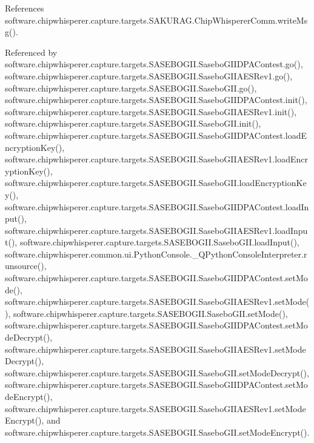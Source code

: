 References software.\+chipwhisperer.\+capture.\+targets.\+S\+A\+K\+U\+R\+A\+G.\+Chip\+Whisperer\+Comm.\+write\+Msg().



Referenced by software.\+chipwhisperer.\+capture.\+targets.\+S\+A\+S\+E\+B\+O\+G\+I\+I.\+Sasebo\+G\+I\+I\+D\+P\+A\+Contest.\+go(), software.\+chipwhisperer.\+capture.\+targets.\+S\+A\+S\+E\+B\+O\+G\+I\+I.\+Sasebo\+G\+I\+I\+A\+E\+S\+Rev1.\+go(), software.\+chipwhisperer.\+capture.\+targets.\+S\+A\+S\+E\+B\+O\+G\+I\+I.\+Sasebo\+G\+I\+I.\+go(), software.\+chipwhisperer.\+capture.\+targets.\+S\+A\+S\+E\+B\+O\+G\+I\+I.\+Sasebo\+G\+I\+I\+D\+P\+A\+Contest.\+init(), software.\+chipwhisperer.\+capture.\+targets.\+S\+A\+S\+E\+B\+O\+G\+I\+I.\+Sasebo\+G\+I\+I\+A\+E\+S\+Rev1.\+init(), software.\+chipwhisperer.\+capture.\+targets.\+S\+A\+S\+E\+B\+O\+G\+I\+I.\+Sasebo\+G\+I\+I.\+init(), software.\+chipwhisperer.\+capture.\+targets.\+S\+A\+S\+E\+B\+O\+G\+I\+I.\+Sasebo\+G\+I\+I\+D\+P\+A\+Contest.\+load\+Encryption\+Key(), software.\+chipwhisperer.\+capture.\+targets.\+S\+A\+S\+E\+B\+O\+G\+I\+I.\+Sasebo\+G\+I\+I\+A\+E\+S\+Rev1.\+load\+Encryption\+Key(), software.\+chipwhisperer.\+capture.\+targets.\+S\+A\+S\+E\+B\+O\+G\+I\+I.\+Sasebo\+G\+I\+I.\+load\+Encryption\+Key(), software.\+chipwhisperer.\+capture.\+targets.\+S\+A\+S\+E\+B\+O\+G\+I\+I.\+Sasebo\+G\+I\+I\+D\+P\+A\+Contest.\+load\+Input(), software.\+chipwhisperer.\+capture.\+targets.\+S\+A\+S\+E\+B\+O\+G\+I\+I.\+Sasebo\+G\+I\+I\+A\+E\+S\+Rev1.\+load\+Input(), software.\+chipwhisperer.\+capture.\+targets.\+S\+A\+S\+E\+B\+O\+G\+I\+I.\+Sasebo\+G\+I\+I.\+load\+Input(), software.\+chipwhisperer.\+common.\+ui.\+Python\+Console.\+\_\+\+Q\+Python\+Console\+Interpreter.\+runsource(), software.\+chipwhisperer.\+capture.\+targets.\+S\+A\+S\+E\+B\+O\+G\+I\+I.\+Sasebo\+G\+I\+I\+D\+P\+A\+Contest.\+set\+Mode(), software.\+chipwhisperer.\+capture.\+targets.\+S\+A\+S\+E\+B\+O\+G\+I\+I.\+Sasebo\+G\+I\+I\+A\+E\+S\+Rev1.\+set\+Mode(), software.\+chipwhisperer.\+capture.\+targets.\+S\+A\+S\+E\+B\+O\+G\+I\+I.\+Sasebo\+G\+I\+I.\+set\+Mode(), software.\+chipwhisperer.\+capture.\+targets.\+S\+A\+S\+E\+B\+O\+G\+I\+I.\+Sasebo\+G\+I\+I\+D\+P\+A\+Contest.\+set\+Mode\+Decrypt(), software.\+chipwhisperer.\+capture.\+targets.\+S\+A\+S\+E\+B\+O\+G\+I\+I.\+Sasebo\+G\+I\+I\+A\+E\+S\+Rev1.\+set\+Mode\+Decrypt(), software.\+chipwhisperer.\+capture.\+targets.\+S\+A\+S\+E\+B\+O\+G\+I\+I.\+Sasebo\+G\+I\+I.\+set\+Mode\+Decrypt(), software.\+chipwhisperer.\+capture.\+targets.\+S\+A\+S\+E\+B\+O\+G\+I\+I.\+Sasebo\+G\+I\+I\+D\+P\+A\+Contest.\+set\+Mode\+Encrypt(), software.\+chipwhisperer.\+capture.\+targets.\+S\+A\+S\+E\+B\+O\+G\+I\+I.\+Sasebo\+G\+I\+I\+A\+E\+S\+Rev1.\+set\+Mode\+Encrypt(), and software.\+chipwhisperer.\+capture.\+targets.\+S\+A\+S\+E\+B\+O\+G\+I\+I.\+Sasebo\+G\+I\+I.\+set\+Mode\+Encrypt().


